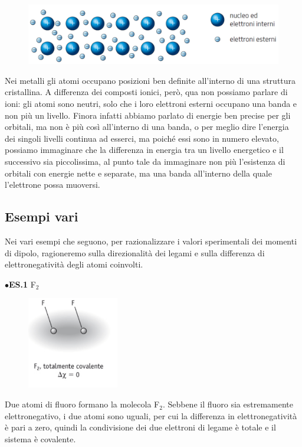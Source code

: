 \begin{figure}[htp]
    \centering
    \includegraphics[width=14cm]{immagini/legame-metallico.png}
\end{figure}

Nei metalli gli atomi occupano posizioni ben definite all'interno di una struttura cristallina. A differenza dei composti ionici, però, qua non possiamo parlare di ioni: gli atomi sono neutri, solo che i loro elettroni esterni occupano una banda e non più un livello. Finora infatti abbiamo parlato di energie ben precise per gli orbitali, ma non è più così all'interno di una banda, o per meglio dire l'energia dei singoli livelli continua ad esserci, ma poiché essi sono in numero elevato, possiamo immaginare che la differenza in energia tra un livello energetico e il successivo sia piccolissima, al punto tale da immaginare non più l'esistenza di orbitali con energie nette e separate, ma una banda all'interno della quale l'elettrone possa muoversi.

\subsection{Esempi vari}
Nei vari esempi che seguono, per razionalizzare i valori sperimentali dei momenti di dipolo, ragioneremo sulla direzionalità dei legami e sulla differenza di elettronegatività degli atomi coinvolti.

\vspace{0.2cm}$\bullet$\textbf{ES.1} F$_2$

\begin{figure}[htp]
    \centering
    \includegraphics[width=4cm]{immagini/F_2.png}
\end{figure}

Due atomi di fluoro formano la molecola F$_2$. Sebbene il fluoro sia estremamente elettronegativo, i due atomi sono uguali, per cui la differenza in elettronegatività è pari a zero, quindi la condivisione dei due elettroni di legame è totale e il sistema è covalente.

